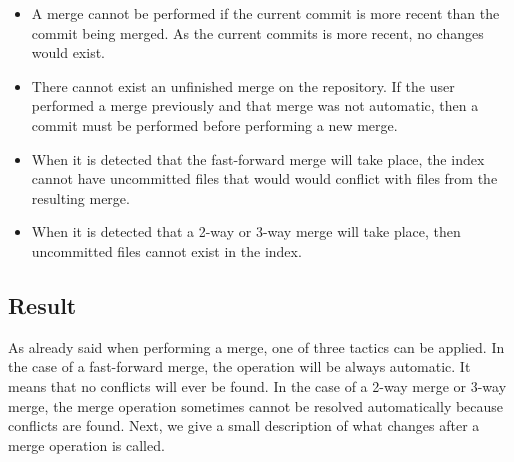 \begin{itemize}
   \item A merge cannot be performed if the current commit is more
   recent than the commit being merged. As the current commits is more
   recent, no changes would exist. 
   
   \item There cannot exist an unfinished merge on the repository. If
   the user performed a merge previously and that merge was not
   automatic, then a commit must be performed before performing a new
   merge.
   
   \item When it is detected that the fast-forward merge will take
   place, the index cannot have uncommitted files that would would
   conflict with files from the resulting merge.
   
   \item When it is detected that a 2-way or 3-way merge will take
   place, then uncommitted files cannot exist in the index.
\end{itemize}

\subsection{Result}
As already said when performing a merge, one of three tactics can be
applied. In the case of a fast-forward merge, the operation will be
always automatic. It means that no conflicts will ever be found. In
the case of a 2-way merge or 3-way merge, the merge operation sometimes cannot
be resolved automatically because conflicts are found. Next, we give a
small description of what changes after a merge operation is called.

